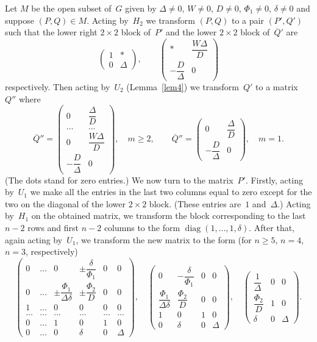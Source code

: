 \documentclass[12pt]{amsart}
\theoremstyle{definition}
\theoremstyle{remark}
\begin{document}
Let $M$ be the open subset of~$G$ given by $\Delta\ne0$, $W \ne 0$,
$D\ne0$, $\Phi_1\ne0$, $\delta\ne0$ and suppose $(P,Q)\in M$. Acting
by~$H_2$ we transform $(P,Q)$ to a pair $(P',Q')$ such that the
lower right $2\times2$ block of~$P'$ and the lower $2\times2$ block
of~$\overline Q{}'$ are
$$
\begin{pmatrix}
1 & *
\\
0 & \Delta
\end{pmatrix},\qquad
\begin{pmatrix}
* & \dfrac{W\Delta}{D}
\\
-\dfrac{D}{\Delta} & 0
\end{pmatrix}
$$
respectively. Then acting by~$U_2$ (Lemma~\ref{lem4}) we
transform~$Q'$ to a matrix~$Q''$ where
$$
\overline Q{}''=\begin{pmatrix} 0 & \dfrac{\Delta}{D}
\\
\hdots & \hdots
\\
0 & \dfrac{W\Delta}{D}
\\
-\dfrac{D}{\Delta} & 0
\end{pmatrix},\quad
m{\geqslant}2,\qquad \overline Q{}''=
\begin{pmatrix}
0 & \dfrac{\Delta}{D}
\\
-\dfrac{D}{\Delta} & 0
\end{pmatrix},\quad
m=1.
$$
(The dots stand for zero entries.) We now turn to the matrix~$P'$.
Firstly, acting by~$U_1$ we make all the entries in the last two
columns equal to zero except for the two on the diagonal of the
lower $2\times2$ block. (These entries are~$1$ and~$\Delta$.) Acting
by~$H_1$ on the obtained matrix, we transform the block
corresponding to the last $n-2$ rows and first $n-2$ columns to the
form ${\operatorname{diag}}(1,\dots,1,\delta)$. After that, again acting by~$U_1$,
we transform the new matrix to the form (for $n{\geqslant}5$, $n=4$, $n=3$,
respectively)
\begin{equation}
\label{eq5}
\begin{pmatrix}
0 & \hdots & 0 & \pm\dfrac{\delta}{\Phi_1} & 0 & 0
\\[3mm]
0 & \hdots & \pm\dfrac{\Phi_1}{\Delta\delta} & \pm\dfrac{\Phi_2}{D}
& 0 & 0
\\[2mm]
1 & \hdots & 0 & 0 & 0 & 0
\\
\hdots & \hdots & \hdots & \hdots & \hdots & \hdots
\\
0 & \hdots & 1 & 0 & 1 & 0
\\
0 & \hdots & 0 & \delta & 0 & \Delta
\end{pmatrix},\quad
\begin{pmatrix}
0 & -\dfrac{\delta}{\Phi_1} & 0 & 0
\\[3mm]
\dfrac{\Phi_1}{\Delta\delta} & \dfrac{\Phi_2}{D} & 0 & 0
\\[3mm]
1 & 0 & 1 & 0
\\
0 & \delta & 0 & \Delta
\end{pmatrix},\quad
\begin{pmatrix}
\dfrac{1}{\Delta}& 0 & 0
\\[3mm]
\dfrac{\Phi_2}D & 1 & 0
\\[2mm]
\delta & 0 & \Delta
\end{pmatrix}.
\end{equation}
\end{document}
